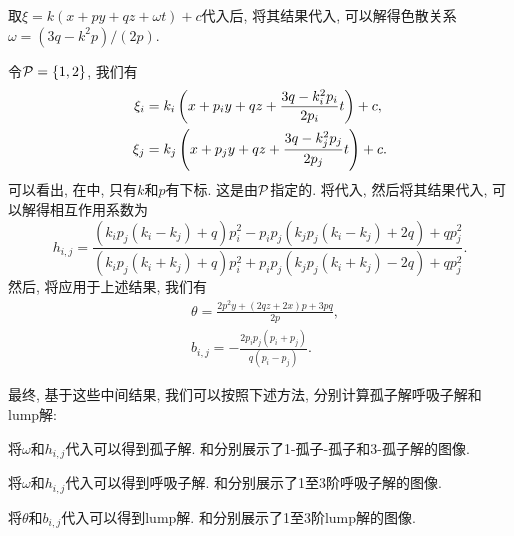 取$\xi=k(x+py+qz+\omega t)+c$代入后, 将其结果代入, 可以解得色散关系$\omega=(3q-k^2p)/(2p)$.

令$\mathcal{P}=\left\{1,2\right\}$, 我们有
\begin{equation}
\begin{split}
\xi_i&=k_i\left(x+p_iy+qz+\frac{3q-k_i^2p_i}{2p_i}t\right)+c, \\ 
\xi_j&=k_j\left(x+p_jy+qz+\frac{3q-k_j^2p_j}{2p_j}t\right)+c.
\end{split} \label{JMEQ-xij}
\end{equation}
可以看出, 在中, 只有$k$和$p$有下标. 这是由$\mathcal{P}$指定的. 将代入, 然后将其结果代入, 可以解得相互作用系数为
\begin{equation}
    h_{i,j}=\frac{(k_ip_j(k_i-k_j)+q)p_i^2-p_ip_j(k_jp_j(k_i-k_j)+2q)+qp_j^2}{(k_ip_j(k_i+k_j)+q)p_i^2+p_ip_j(k_jp_j(k_i+k_j)-2q)+qp_j^2}.
\end{equation}
然后, 将应用于上述结果, 我们有
\begin{equation}
\begin{split}
&\theta=\frac{2p^2y+(2qz+2x)p+3pq}{2p}, \\ 
&b_{i,j}=-\frac{2p_ip_j(p_i+p_j)}{q(p_i-p_j)}.
\end{split}
\end{equation}

最终, 基于这些中间结果, 我们可以按照下述方法, 分别计算孤子解\zdh 呼吸子解和lump解:
\begin{compactitem}[\textbullet]
\item 将$\omega$和$h_{i,j}$代入可以得到孤子解. \zdh {}和分别展示了1-孤子-孤子和3-孤子解的图像. 
\item 将$\omega$和$h_{i,j}$代入可以得到呼吸子解. \zdh{}和分别展示了1至3阶呼吸子解的图像.
\item 将$\theta$和$b_{i,j}$代入可以得到lump解. \zdh{}和分别展示了1至3阶lump解的图像.  
\end{compactitem}

